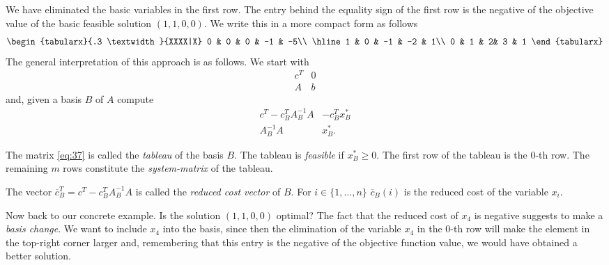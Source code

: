 We have eliminated the basic variables in the first row. The entry
behind the equality sign of the first row is the negative of the
objective value of the basic feasible solution $(1,1,0,0)$. We write
this in a more compact form as follows 
\begin{equation}
  \label{eq:36}
  \begin{tabularx}{.3 \textwidth}{XXXX|X}
    0   &      0 &     0  &    -1   &   -5\\ \hline 
    1   &    0  &    -1  &    -2 &      1\\
    0 &     1 &     2&     3  &     1
  \end{tabularx}
\end{equation}
%
The general interpretation of this approach is as follows. We
start with 
\begin{displaymath}
   \begin{array}{c|c}
    c^T  & 0 \\ \hline 
   A        & b
  \end{array}
\end{displaymath}
and, given a basis $B$ of $A$ compute 
\begin{equation}
  \label{eq:37}
  \begin{array}{c|c}
    c^T - c_B^TA_B^{-1}A & -c_B^Tx^*_B \\ \hline 
    A_B^{-1}A        & x^*_B.
  \end{array}
\end{equation}
\begin{definition}
  The matrix \eqref{eq:37} is called the \emph{tableau} of the basis
  $B$. The tableau is \emph{feasible} if $x^*_B\geq0$. The first row of
  the tableau is the $0$-th row. The remaining $m$ rows constitute the
  \emph{system-matrix} of the tableau. 

  The vector $\overline{c}^T_B = c^T- c_B^TA_B^{-1}A$ is called the \emph{reduced cost vector} of $B$. For
  $i \in \{1,\ldots,n\}$ $\overline{c}_B(i)$ is the reduced cost of the
  variable $x_i$. 
\end{definition}
Now back to our concrete example. Is the solution $(1,1,0,0)$ optimal?
The fact that the reduced cost of $x_4$ is negative suggests to make a
\emph{basis change}. We want to include $x_4$ into the basis, since
then the elimination of the variable $x_4$ in the $0$-th row will make
the element in the top-right corner larger and, remembering that this
entry is the negative of the objective function value, we would have
obtained  a
better solution. %
